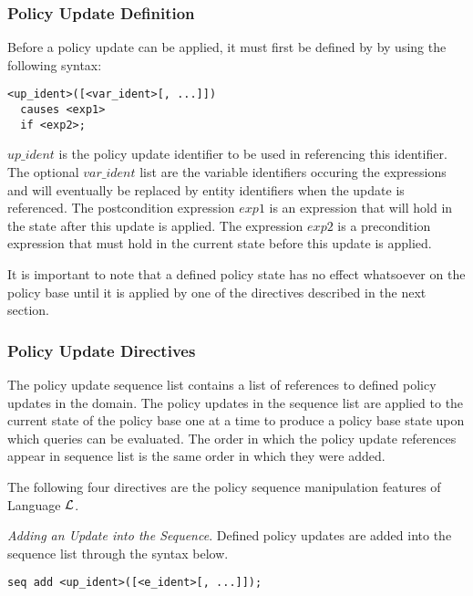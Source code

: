 \documentclass[10pt, twocolumn]{article}
\begin{document}
      \subsubsection{Policy Update Definition}

        Before a policy update can be applied, it must first be defined by
        by using the following syntax:

\begin{verbatim}
<up_ident>([<var_ident>[, ...]])
  causes <exp1>
  if <exp2>;
\end{verbatim}

        $up\_ident$ is the policy update identifier to be used in referencing
        this identifier. The optional $var\_ident$ list are the variable
        identifiers occuring the expressions and will eventually be replaced
        by entity identifiers when the update is referenced. The postcondition
        expression $exp1$ is an expression that will hold in the state after
        this update is applied. The expression $exp2$ is a precondition
        expression that must hold in the current state before this update is
        applied.

        It is important to note that a defined policy state has no effect
        whatsoever on the policy base until it is applied by one of the
        directives described in the next section.

      \subsubsection{Policy Update Directives}

        The policy update sequence list contains a list of references to
        defined policy updates in the domain. The policy updates in the
        sequence list are applied to the current state of the policy base one
        at a time to produce a policy base state upon which queries can be
        evaluated. The order in which the policy update references appear in
        sequence list is the same order in which they were added.

        The following four directives are the policy sequence manipulation
        features of Language $\cal{L}$.

        \emph{Adding an Update into the Sequence}. Defined policy updates are
        added into the sequence list through the syntax below.

        \begin{verbatim}seq add <up_ident>([<e_ident>[, ...]]);\end{verbatim}
\end{document}
